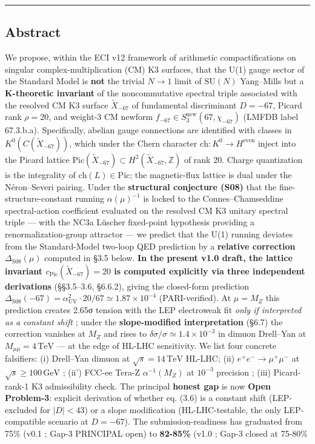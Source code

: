 \documentclass[
  11pt,
  a4paper,
]{article}
\begin{document}
\begin{center}\rule{0.5\linewidth}{0.5pt}\end{center}

\hypertarget{abstract}{%
\subsection{Abstract}\label{abstract}}

We propose, within the ECI v12 framework of arithmetic compactifications on singular complex-multiplication (CM) K3 surfaces, that the U(1) gauge sector of the Standard Model is \textbf{not} the trivial \(N \to 1\) limit of \(\mathrm{SU}(N)\) Yang--Mills but a \textbf{K-theoretic invariant} of the noncommutative spectral triple associated with the resolved CM K3 surface \(\tilde X_{-67}\) of fundamental discriminant \(D = -67\), Picard rank \(\rho = 20\), and weight-3 CM newform \(f_{-67} \in S_3^{\mathrm{new}}(67, \chi_{-67})\) (LMFDB label 67.3.b.a). Specifically, abelian gauge connections are identified with classes in \(K^0(C(\tilde X_{-67}))\), which under the Chern character \(\mathrm{ch}: K^0 \to H^{\mathrm{even}}\) inject into the Picard lattice \(\mathrm{Pic}(\tilde X_{-67}) \subset H^2(\tilde X_{-67}, \mathbb{Z})\) of rank 20. Charge quantization is the integrality of \(\mathrm{ch}(L) \in \mathrm{Pic}\); the magnetic-flux lattice is dual under the Néron--Severi pairing. Under the \textbf{structural conjecture (S08)} that the fine-structure-constant running \(\alpha(\mu)^{-1}\) is locked to the Connes--Chamseddine spectral-action coefficient evaluated on the resolved CM K3 unitary spectral triple --- with the NC3a Lüscher fixed-point hypothesis providing a renormalization-group attractor --- we predict that the U(1) running deviates from the Standard-Model two-loop QED prediction by a \textbf{relative correction \(\Delta_{\mathrm{S08}}(\mu)\)} computed in §3.5 below. \textbf{In the present v1.0 draft, the lattice invariant \(c_{\mathrm{Pic}}(\tilde X_{-67}) = 20\) is computed explicitly via three independent derivations} (§§3.5--3.6, §6.6.2), giving the closed-form prediction \(\Delta_{\mathrm{S08}}(-67) = \alpha_{\mathrm{UV}}^2 \cdot 20/67 \simeq 1.87 \times 10^{-4}\) (PARI-verified). At \(\mu = M_Z\) this prediction creates 2.65σ tension with the LEP electroweak fit \emph{only if interpreted as a constant shift} ; under the \textbf{slope-modified interpretation} (§6.7) the correction vanishes at \(M_Z\) and rises to \(\delta\sigma/\sigma \simeq 1.4 \times 10^{-3}\) in dimuon Drell--Yan at \(M_{\mu\mu} = 4\,\mathrm{TeV}\) --- at the edge of HL-LHC sensitivity. We list four concrete falsifiers: (i) Drell--Yan dimuon at \(\sqrt{s} = 14\,\mathrm{TeV}\) HL-LHC; (ii) \(e^+e^- \to \mu^+\mu^-\) at \(\sqrt{s} \ge 100\,\mathrm{GeV}\) ; (ii') FCC-ee Tera-Z \(\alpha^{-1}(M_Z)\) at \(10^{-3}\) precision ; (iii) Picard-rank-1 K3 admissibility check. The principal \textbf{honest gap} is now \textbf{Open Problem-3}: explicit derivation of whether eq. (3.6) is a constant shift (LEP-excluded for \(|D| < 43\)) or a slope modification (HL-LHC-testable, the only LEP-compatible scenario at \(D = -67\)). The submission-readiness has graduated from 75\% (v0.1 ; Gap-3 PRINCIPAL open) to \textbf{82-85\%} (v1.0 ; Gap-3 closed at 75-80\% 
\end{document}
